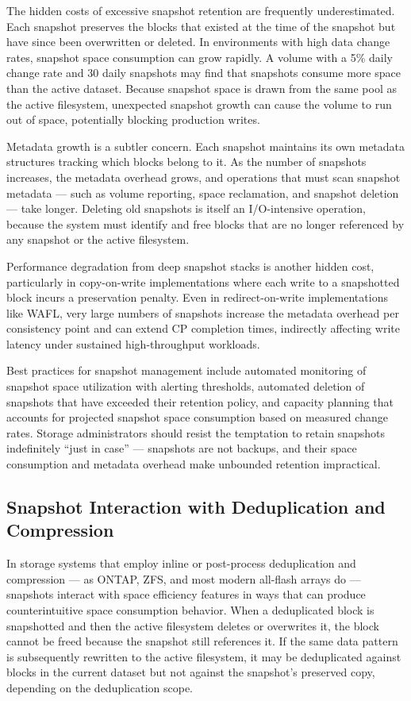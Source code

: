 The hidden costs of excessive snapshot retention are frequently underestimated. Each snapshot preserves the blocks that existed at the time of the snapshot but have since been overwritten or deleted. In environments with high data change rates, snapshot space consumption can grow rapidly. A volume with a 5\% daily change rate and 30 daily snapshots may find that snapshots consume more space than the active dataset. Because snapshot space is drawn from the same pool as the active filesystem, unexpected snapshot growth can cause the volume to run out of space, potentially blocking production writes.

Metadata growth is a subtler concern. Each snapshot maintains its own metadata structures tracking which blocks belong to it. As the number of snapshots increases, the metadata overhead grows, and operations that must scan snapshot metadata --- such as volume reporting, space reclamation, and snapshot deletion --- take longer. Deleting old snapshots is itself an I/O-intensive operation, because the system must identify and free blocks that are no longer referenced by any snapshot or the active filesystem.

Performance degradation from deep snapshot stacks is another hidden cost, particularly in copy-on-write implementations where each write to a snapshotted block incurs a preservation penalty. Even in redirect-on-write implementations like WAFL, very large numbers of snapshots increase the metadata overhead per consistency point and can extend CP completion times, indirectly affecting write latency under sustained high-throughput workloads.

Best practices for snapshot management include automated monitoring of snapshot space utilization with alerting thresholds, automated deletion of snapshots that have exceeded their retention policy, and capacity planning that accounts for projected snapshot space consumption based on measured change rates. Storage administrators should resist the temptation to retain snapshots indefinitely ``just in case'' --- snapshots are not backups, and their space consumption and metadata overhead make unbounded retention impractical.

\subsection{Snapshot Interaction with Deduplication and Compression}

In storage systems that employ inline or post-process deduplication and compression --- as ONTAP, ZFS, and most modern all-flash arrays do --- snapshots interact with space efficiency features in ways that can produce counterintuitive space consumption behavior. When a deduplicated block is snapshotted and then the active filesystem deletes or overwrites it, the block cannot be freed because the snapshot still references it. If the same data pattern is subsequently rewritten to the active filesystem, it may be deduplicated against blocks in the current dataset but not against the snapshot's preserved copy, depending on the deduplication scope.

